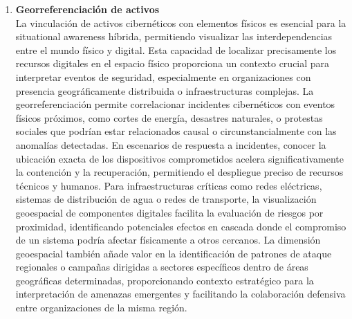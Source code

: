 \begin{enumerate}
\item \textbf{Georreferenciación de activos} \\
La vinculación de activos cibernéticos con elementos físicos es esencial para la situational awareness híbrida, permitiendo visualizar las interdependencias entre el mundo físico y digital. Esta capacidad de localizar precisamente los recursos digitales en el espacio físico proporciona un contexto crucial para interpretar eventos de seguridad, especialmente en organizaciones con presencia geográficamente distribuida o infraestructuras complejas. La georreferenciación permite correlacionar incidentes cibernéticos con eventos físicos próximos, como cortes de energía, desastres naturales, o protestas sociales que podrían estar relacionados causal o circunstancialmente con las anomalías detectadas. En escenarios de respuesta a incidentes, conocer la ubicación exacta de los dispositivos comprometidos acelera significativamente la contención y la recuperación, permitiendo el despliegue preciso de recursos técnicos y humanos. Para infraestructuras críticas como redes eléctricas, sistemas de distribución de agua o redes de transporte, la visualización geoespacial de componentes digitales facilita la evaluación de riesgos por proximidad, identificando potenciales efectos en cascada donde el compromiso de un sistema podría afectar físicamente a otros cercanos. La dimensión geoespacial también añade valor en la identificación de patrones de ataque regionales o campañas dirigidas a sectores específicos dentro de áreas geográficas determinadas, proporcionando contexto estratégico para la interpretación de amenazas emergentes y facilitando la colaboración defensiva entre organizaciones de la misma región.


\end{enumerate}
